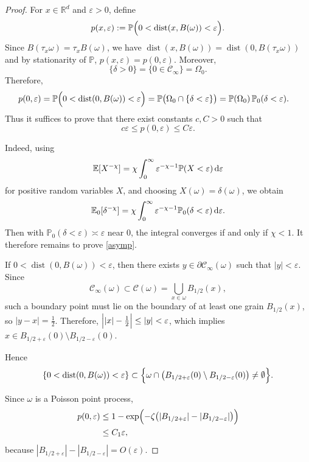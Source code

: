 \documentclass[11pt]{article}
\renewcommand{\d}{{\rm d}}
\newcommand{\dist}{\mathop{\mathrm{dist}}}
\newcommand{\E}{\mathbb E}
\renewcommand{\P}{\mathbb P}
\theoremstyle{rem}
\begin{document}
\begin{proof}
For $x\in\mathbb R^d$ and $\varepsilon>0$, define
\begin{equation}\label{def p}
p(x,\varepsilon)
:=
\P\Bigl(
0<
\dist(x,B(\omega))
<
\varepsilon
\Bigr).
\end{equation}
Since $B(\tau_x\omega)=\tau_x B(\omega)$,
we have $\dist(x,B(\omega))
=
\dist(0,B(\tau_x\omega))$ and 
by stationarity of $\P$, $p(x,\varepsilon)=p(0,\varepsilon)$.
Moreover,
\[
\{\delta>0\}
=
\{0\in\mathcal C_\infty\}
=
\Omega_0.
\]
Therefore,
\begin{equation}\label{rel}
\begin{aligned}
p(0,\varepsilon)
=
\P\Bigl(
0<
\dist(0,B(\omega))
<
\varepsilon
\Bigr)
&=
\P\bigl(
\Omega_0\cap\{\delta<\varepsilon\}
\bigr)
=
\P(\Omega_0)\,
\P_0(\delta<\varepsilon).
\end{aligned}
\end{equation}
Thus it suffices to prove that there exist constants $c,C>0$ such that
\begin{equation}\label{asymp}
c\varepsilon
\le
p(0,\varepsilon)
\le
C\varepsilon.
\end{equation}

Indeed, using
\[
\E[X^{-\chi}]
=
\chi\int_0^\infty
\varepsilon^{-\chi-1}
\P(X<\varepsilon)
\,\d\varepsilon
\]
for positive random variables $X$, and choosing
$X(\omega)=\delta(\omega)$,
we obtain
$$
\E_0[\delta^{-\chi}]
=
\chi
\int_0^\infty
\varepsilon^{-\chi-1}
\P_0(\delta<\varepsilon)
\,\d\varepsilon.
$$
Then with $\P_0(\delta<\varepsilon)\asymp\varepsilon$ 
near $0$, the integral converges if and only if $\chi<1$.
It therefore remains to prove \eqref{asymp}.

\medskip

If $0<
\dist(0,B(\omega))
<
\varepsilon$,
then there exists
$y\in\partial\mathcal C_\infty(\omega)$
such that $|y|<\varepsilon$. Since
\[
\mathcal C_\infty(\omega)
\subset
\mathcal C(\omega)
=
\bigcup_{x\in\omega}B_{1/2}(x),
\]
such a boundary point must lie on the boundary of at least one grain
$B_{1/2}(x)$, so
$|y-x|=\frac12$. Therefore,
$\Bigl||x|-\frac12\Bigr|
\leq
|y|
<
\varepsilon$, 
which implies
$x\in
B_{1/2+\varepsilon}(0)
\setminus
B_{1/2-\varepsilon}(0)$.

Hence
\[
\{0<\dist(0,B(\omega))<\varepsilon\}
\subset
\Bigl\{
\omega\cap
\bigl(
B_{1/2+\varepsilon}(0)
\setminus
B_{1/2-\varepsilon}(0)
\bigr)
\neq\emptyset
\Bigr\}.
\]

Since $\omega$ is a Poisson point process,
\[
\begin{aligned}
p(0,\varepsilon)
&\le
1-
\exp\Bigl(
-\zeta
\bigl(
|B_{1/2+\varepsilon}|
-
|B_{1/2-\varepsilon}|
\bigr)
\Bigr)
\\
&\le
C_1\varepsilon,
\end{aligned}
\]
because $|B_{1/2+\varepsilon}|
-
|B_{1/2-\varepsilon}|
=
O(\varepsilon)$.



\end{proof}
\end{document}

